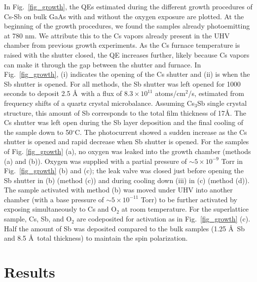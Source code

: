 In Fig.~\ref{fig_growth}, the QEs estimated during the different growth procedures of Cs-Sb on bulk GaAs with and without  the oxygen exposure are plotted.  
At the beginning of the growth procedures, we found the samples already photoemitting at 780 nm. We attribute this to the Cs vapors already present in the UHV chamber from previous growth experiments. As the Cs furnace temperature is raised with the shutter closed, the QE increases further, likely because Cs vapors can make it through the gap between the shutter and furnace. In Fig.~\ref{fig_growth}, (i) indicates the opening of the Cs shutter and (ii) is when the Sb shutter is opened. For all methods, the Sb shutter was left opened for 1000 seconds to deposit 2.5 \AA\ with a flux of $8.3 \times 10^{11}$ atoms/cm$^2$/s, estimated from frequency shifts of a quartz crystal microbalance. Assuming Cs$_3$Sb single crystal structure, this amount of Sb corresponds to the total film thickness of 17\AA.\cite{hagino1966} The Cs shutter was left open during the Sb layer deposition and the final cooling of the sample down to 50$^\circ$C. The photocurrent showed a sudden increase as the Cs shutter is opened and rapid decrease when Sb shutter is opened. 
For the samples of Fig. \ref{fig_growth} (a), no oxygen was leaked into the growth chamber (methods (a) and (b)). Oxygen was supplied with a partial pressure of $\sim 5 \times 10^{-9}$ Torr  in Fig.~\ref{fig_growth} (b) and (c); the leak valve was closed just before opening the Sb shutter in (b) (method (c)) and during cooling down (iii) in (c) (method (d)). %
The sample activated with method (b) was moved under UHV into another chamber (with a base pressure of $\sim 5 \times 10^{-11}$ Torr) to be further activated by exposing simultaneously to Cs and O$_2$ at room temperature. For the superlattice sample, Cs, Sb, and O$_2$ are codeposited for activation as in Fig.~\ref{fig_growth} (c).
Half the amount of Sb was deposited compared to the bulk samples (1.25 \AA\ Sb and 8.5 \AA\ total thickness) to maintain the spin polarization.\cite{cultrera2020_LongLifetimePolarized}

\section{Results}

